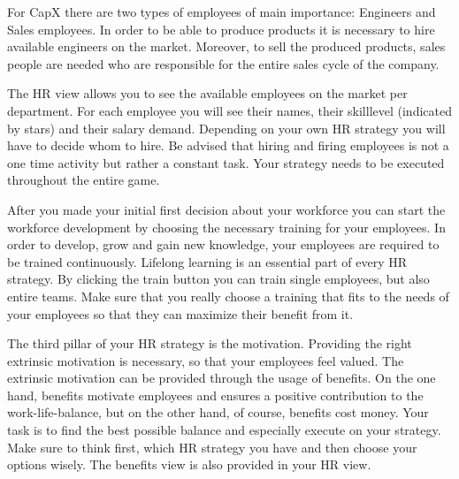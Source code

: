 For CapX there are two types of employees of main importance: Engineers and Sales employees. In order to be able to produce products it is necessary to hire available engineers on the market. Moreover, to sell the produced products, sales people are needed who are responsible for the entire sales cycle of the company.

The HR view allows you to see the available employees on the market per department. For each employee you will see their names, their skilllevel (indicated by stars) and their salary demand. Depending on your own HR strategy you will have to decide whom to hire. Be advised that hiring and firing employees is not a one time activity but rather a constant task. Your strategy needs to be executed throughout the entire game.

After you made your initial first decision about your workforce you can start the workforce development by choosing the necessary training for your employees. In order to develop, grow and gain new knowledge, your employees are required to be trained continuously. Lifelong learning is an essential part of every HR strategy. By clicking the train button you can train single employees, but also entire teams. Make sure that you really choose a training that fits to the needs of your employees so that they can maximize their benefit from it.

The third pillar of your HR strategy is the motivation. Providing the right extrinsic motivation is necessary, so that your employees feel valued. The extrinsic motivation can be provided through the usage of benefits. On the one hand, benefits motivate employees and ensures a positive contribution to the work-life-balance, but on the other hand, of course, benefits cost money. Your task is to find the best possible balance and especially execute on your strategy. Make sure to think first, which HR strategy you have and then choose your options wisely. The benefits view is also provided in your HR view.